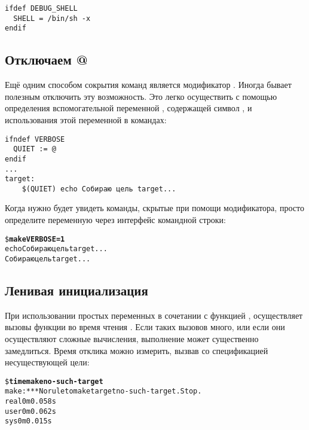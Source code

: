 {\footnotesize
\begin{verbatim}
ifdef DEBUG_SHELL
  SHELL = /bin/sh -x
endif
\end{verbatim}
}

\subsection{Отключаем @}
Ещё одним способом сокрытия команд является модификатор .
Иногда бывает полезным отключить эту возможность. Это легко
осуществить с помощью определения вспомогательной переменной
, содержащей символ , и использования этой
переменной в командах:

{\footnotesize
\begin{verbatim}
ifndef VERBOSE
  QUIET := @
endif
...
target:
    $(QUIET) echo Собираю цель target...
\end{verbatim}
}

Когда нужно будет увидеть команды, скрытые при помощи модификатора,
просто определите переменную  через интерфейс
командной строки:

{\footnotesize
\begin{alltt}
\$ \textbf{make VERBOSE=1}
echo Собираю цель target...
Собираю цель target...
\end{alltt}
}

\subsection{Ленивая инициализация}
При использовании простых переменных в сочетании с функцией
, \GNUmake{} осуществляет вызовы функции
 во время чтения . Если таких вызовов
много, или если они осуществляют сложные вычисления, выполнение
\GNUmake{} может существенно замедлиться. Время отклика \GNUmake{}
можно измерить, вызвав \GNUmake{} со спецификацией несуществующей
цели:

{\footnotesize
\begin{alltt}
\$ \textbf{time make no-such-target}
make: *** No rule to make target no-such-target. Stop.
real    0m0.058s
user    0m0.062s
sys     0m0.015s
\end{alltt}
}

